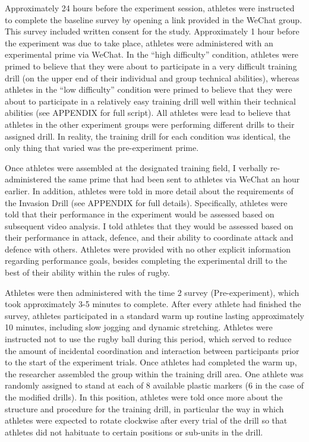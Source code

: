 Approximately 24 hours before the experiment session, athletes were instructed to complete the baseline survey by opening a link provided in the WeChat group.  This survey included written consent for the study. Approximately 1 hour before the experiment was due to take place, athletes were administered with an experimental prime via WeChat.  In the ``high difficulty'' condition, athletes were primed to believe that they were about to participate in a very difficult training drill (on the upper end of their individual and group technical abilities), whereas athletes in the ``low difficulty'' condition were primed to believe that they were about to participate in a relatively easy training drill well within their technical abilities (see APPENDIX for full script). All athletes were lead to believe that athletes in the other experiment groups were performing different drills to their assigned drill. In reality, the training drill for each condition was identical, the only thing that varied was the pre-experiment prime.

Once athletes were assembled at the designated training field, I verbally re-administered the same prime that had been sent to athletes via WeChat an hour earlier.  In addition, athletes were told in more detail about the requirements of the Invasion Drill (see APPENDIX for full details).  Specifically, athletes were told that their performance in the experiment would be assessed based on subsequent video analysis.  I told athletes that they would be assessed based on their performance in attack, defence, and their ability to coordinate attack and defence with others.  Athletes were provided with no other explicit information regarding performance goals, besides completing the experimental drill to the best of their ability within the rules of rugby.

Athletes were then administered with the time 2 survey (Pre-experiment), which took approximately 3-5 minutes to complete.  After every athlete had finished the survey, athletes participated in a standard warm up routine lasting approximately 10 minutes, including slow jogging and dynamic stretching.  Athletes were instructed not to use the rugby ball during this period, which served to reduce the amount of incidental coordination and interaction between participants prior to the start of the experiment trials.  Once athletes had completed the warm up, the researcher assembled the group within the training drill area.  One athlete was randomly assigned to stand at each of 8 available plastic markers (6 in the case of the modified drills).  In this position, athletes were told once more about the structure and procedure for the training drill, in particular the way in which athletes were expected to rotate clockwise after every trial of the drill so that athletes did not habituate to certain positions or sub-units in the drill.

